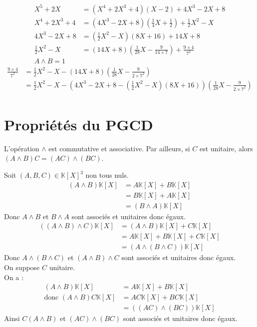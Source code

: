 \documentclass[../main.tex]{subfiles}
\begin{document}
\begin{align*}
    X^5 + 2X &= (X^4 + 2X^3 + 4)(X - 2) + 4X^3 - 2X + 8 \\
    X^4 + 2X^3 + 4 &= (4X^3 - 2X + 8)(\frac{1}{4}X + \frac{1}{2}) + \frac{1}{2}X^2 - X \\
    4X^3 - 2X + 8 &= (\frac{1}{2}X^2 - X)(8X + 16) + 14X + 8 \\
    \frac{1}{2}X^2 - X &= (14X + 8)(\frac{1}{28}X - \frac{9}{14 \times 7}) + \frac{9 \times 4}{7^2} \\
    A \wedge B = 1
\end{align*}
\begin{align*}
    \frac{9 \times 4}{7^2} &= \frac{1}{2}X^2 - X - (14X + 8)(\frac{1}{28}X - \frac{9}{2 \times 7^2}) \\
    &= \frac{1}{2}X^2 - X - (4X^3 - 2X + 8 - (\frac{1}{2}X^2 - X)(8X + 16))(\frac{1}{28}X - \frac{9}{2 \times 7^2}) \\
\end{align*}

\section{Propriétés du PGCD}
\begin{tcolorbox}[title=Propostion 16.27, title filled=false, colframe=lightblue, colback=lightblue!10!white]
    L'opération $\wedge$ est commutative et associative. Par ailleurs, si $C$ est unitaire, alors $(A \wedge B) C = (AC) \wedge (BC)$.
\end{tcolorbox}

\noindent Soit $(A, B, C) \in \mathbb{K}[X]^3$ non tous nuls. 
\begin{align*}
    (A \wedge B) \mathbb{K}[X] &= A \mathbb{K}[X] + B \mathbb{K}[X] \\
    &= B \mathbb{K}[X] + A \mathbb{K}[X] \\
    &= (B \wedge A) \mathbb{K}[X]
\end{align*}
Donc $A \wedge B$ et $B \wedge A$ sont associés et unitaires donc égaux. 
\begin{align*}
    ((A \wedge B) \wedge C) \mathbb{K}[X] &= (A \wedge B) \mathbb{K}[X] + C \mathbb{K}[X] \\
    &= A \mathbb{K}[X] + B \mathbb{K}[X] + C \mathbb{K}[X] \\
    &= (A \wedge (B \wedge C)) \mathbb{K}[X]
\end{align*}
Donc $A \wedge (B \wedge C)$ et $(A \wedge B) \wedge C$ sont associés et unitaires donc égaux. \\
On suppose $C$ unitaire. \\
On a : 
\begin{align*}
    (A \wedge B) \mathbb{K}[X] &= A \mathbb{K}[X] + B \mathbb{K}[X] \\
    \text{donc } (A \wedge B)C \mathbb{K}[X] &= AC \mathbb{K}[X] + BC \mathbb{K}[X] \\
    &= ((AC) \wedge (BC)) \mathbb{K}[X]
\end{align*}
Ainsi $C(A \wedge B)$ et $(AC) \wedge (BC)$ sont associés et unitaires donc égaux.
\end{document}
